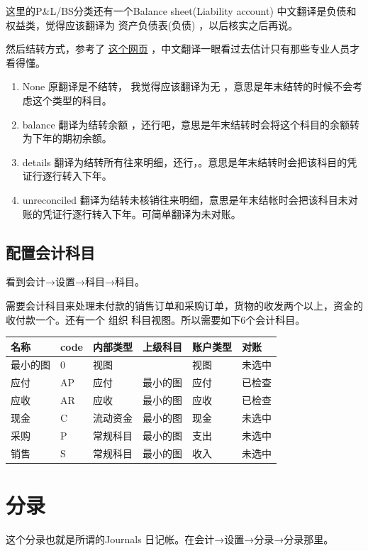 \documentclass[11pt,a4paper]{sphinxmanual}
\begin{document}
这里的P\&L/BS分类还有一个Balance sheet(Liability account) 中文翻译是负债和权益类，觉得应该翻译为 资产负债表(负债) ，以后核实之后再说。

然后结转方式，参考了 \href{http://shine-it.net/index.php?topic=950.0}{这个网页} ，中文翻译一眼看过去估计只有那些专业人员才看得懂。

\begin{enumerate}
\item None  原翻译是不结转， 我觉得应该翻译为无 ，意思是年末结转的时候不会考虑这个类型的科目。
\item balance 翻译为结转余额 ，还行吧，意思是年末结转时会将这个科目的余额转为下年的期初余额。
\item details 翻译为结转所有往来明细，还行，。意思是年末结转时会把该科目的凭证行逐行转入下年。
\item unreconciled 翻译为结转未核销往来明细，意思是年末结帐时会把该科目未对账的凭证行逐行转入下年。可简单翻译为未对账。
\end{enumerate}


\subsection{配置会计科目}
\label{sec-13-5-2}
看到会计→设置→科目→科目。

需要会计科目来处理未付款的销售订单和采购订单，货物的收发两个以上，资金的收付款一个。还有一个 组织 科目视图。所以需要如下6个会计科目。

\begin{center}
\begin{tabular}{llllll}
\toprule
名称 & code & 内部类型 & 上级科目 & 账户类型 & 对账\\
\midrule
最小的图 & 0 & 视图 &  & 视图 & 未选中\\
应付 & AP & 应付 & 最小的图 & 应付 & 已检查\\
应收 & AR & 应收 & 最小的图 & 应收 & 已检查\\
现金 & C & 流动资金 & 最小的图 & 现金 & 未选中\\
采购 & P & 常规科目 & 最小的图 & 支出 & 未选中\\
销售 & S & 常规科目 & 最小的图 & 收入 & 未选中\\
\bottomrule
\end{tabular}
\end{center}


\section{分录}
\label{sec-13-6}
这个分录也就是所谓的Journals 日记帐。在会计→设置→分录→分录那里。
\end{document}
